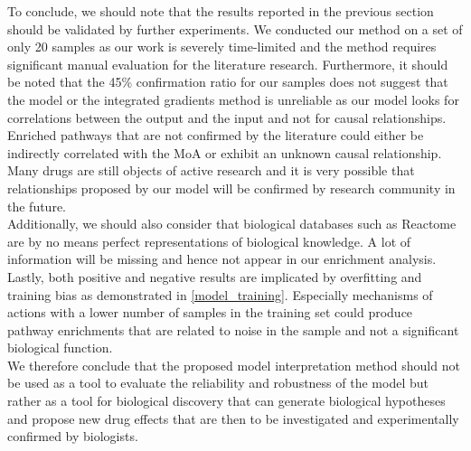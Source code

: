 \documentclass[bsc,frontabs,twoside,singlespacing,parskip,deptreport]{infthesis}     %
\begin{document}
To conclude, we should note that the results reported in the previous section should be validated by further experiments. We conducted our method on a set of only 20 samples as our work is severely time-limited and the method requires significant manual evaluation for the literature research.
Furthermore, it should be noted that the 45\% confirmation ratio for our samples does not suggest that the model or the integrated gradients method is unreliable  as our model looks for correlations between the output and the input and not for causal relationships. Enriched pathways that are not confirmed by the literature could either be indirectly correlated with the MoA or exhibit an unknown causal relationship.  Many drugs are still objects of active research and it is very possible that relationships proposed by our model will be confirmed by research community in the future. \\
Additionally, we should also consider that biological databases such as Reactome are by no means perfect representations of biological knowledge. A lot of information will be missing and hence not appear in our enrichment analysis. \\
Lastly, both positive and negative results are implicated by overfitting and training bias as demonstrated in \ref{model_training}. Especially mechanisms of actions with a lower number of samples in the training set could produce pathway enrichments that are related to noise in the sample and not a significant biological function. \\
We therefore conclude that the proposed model interpretation method should not be used as a tool to evaluate the reliability and robustness of the model but rather as a tool for biological discovery that can generate biological hypotheses  and propose new drug effects that are then to be investigated and experimentally confirmed by biologists.







\end{document}
